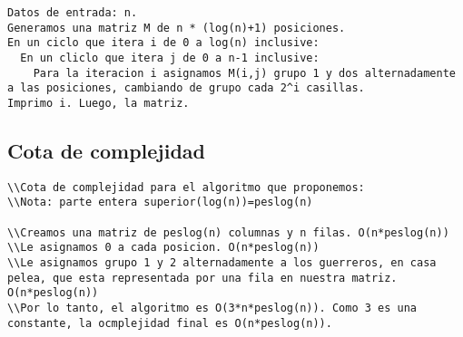 \documentclass[10pt,a4paper]{article}
\begin{document}
\begin{verbatim}
Datos de entrada: n.
Generamos una matriz M de n * (log(n)+1) posiciones.
En un ciclo que itera i de 0 a log(n) inclusive:
  En un cliclo que itera j de 0 a n-1 inclusive:
    Para la iteracion i asignamos M(i,j) grupo 1 y dos alternadamente a las posiciones, cambiando de grupo cada 2^i casillas.
Imprimo i. Luego, la matriz.
\end{verbatim}

\subsection{Cota de complejidad}

\begin{verbatim}
\\Cota de complejidad para el algoritmo que proponemos:
\\Nota: parte entera superior(log(n))=peslog(n)

\\Creamos una matriz de peslog(n) columnas y n filas. O(n*peslog(n))
\\Le asignamos 0 a cada posicion. O(n*peslog(n))
\\Le asignamos grupo 1 y 2 alternadamente a los guerreros, en casa pelea, que esta representada por una fila en nuestra matriz. O(n*peslog(n))
\\Por lo tanto, el algoritmo es O(3*n*peslog(n)). Como 3 es una constante, la ocmplejidad final es O(n*peslog(n)).
\end{verbatim}
\end{document}
